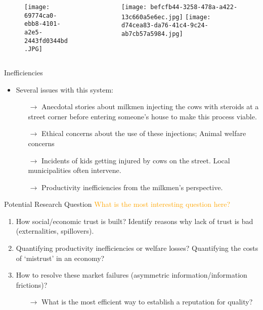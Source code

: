 \documentclass[12pt, aspectratio=169]{beamer}
\begin{document}
\begin{frame}[noframenumbering] {}\label{offerresults}
\begin{columns}
 \begin{column}{0.5\textwidth}
  \begin{figure}
        \texttt{[image: 69774ca0-ebb8-4101-a2e5-2443fd0344bd.JPG]} 
    \end{figure}
    \end{column}
    \begin{column}{0.5\textwidth}
  \begin{figure}
        \texttt{[image: befcfb44-3258-478a-a422-13c660a5e6ec.jpg]} \medbreak 
        \texttt{[image: d74cea83-da76-41c4-9c24-ab7cb57a5984.jpg]}  
\end{figure}
\end{column}
\end{columns}  
\end{frame}

\begin{frame}{Inefficiencies}
\begin{itemize}
\item Several issues with this system: 
\begin{itemize}
    \item [$\rightarrow$] Anecdotal stories about milkmen injecting the cows with steroids at a street corner before entering someone's house to make this process viable.
    \item [$\rightarrow$] Ethical concerns about the use of these injections; Animal welfare concerns 
    \item [$\rightarrow$] Incidents of kids getting injured by cows on the street. Local municipalities often intervene. 
    \item [$\rightarrow$] Productivity inefficiencies from the milkmen's perspective.
\end{itemize}

\end{itemize}
\end{frame}

\begin{frame}{Potential Research Question}
\small
\textcolor{orange}{What is the most interesting question here?}
\begin{enumerate}
\small
    \item How social/economic trust is built? Identify reasons why lack of trust is bad (externalities, spillovers). 
    \item Quantifying productivity inefficiencies or welfare losses? Quantifying the costs of `mistrust' in an economy?
    \item How to resolve these market failures (asymmetric information/information frictions)?
    \begin{itemize}
    \item [$\rightarrow$] What is the most efficient way to establish a reputation for quality? 
    \end{itemize}
\end{enumerate}
\end{frame}
\end{document}
